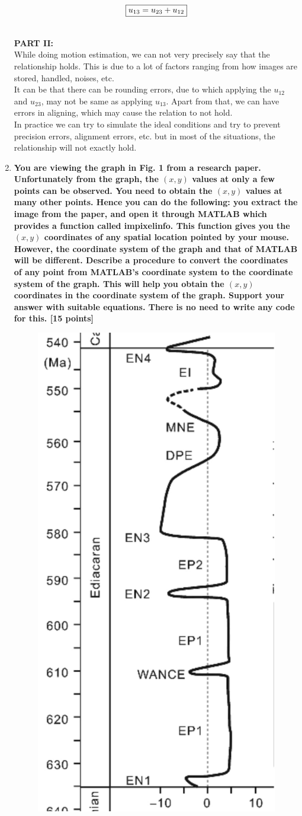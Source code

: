 \documentclass{article}
\begin{document}
\begin{enumerate}
\begin{equation}
    \fbox{$u_{13} = u_{23} + u_{12}$}
\end{equation}

\\\textbf{PART II:}\\
While doing motion estimation, we can not very precisely say that the relationship holds. This is due to a lot of factors ranging from how images are stored, handled, noises, etc. \\
It can be that there can be rounding errors, due to which applying the $u_{12}$ and $u_{23}$, may not be same as applying $u_{13}$. Apart from that, we can have errors in aligning, which may cause the relation to not hold.\\
In practice we can try to simulate the ideal conditions and try to prevent precision errors, alignment errors, etc. but in most of the situations, the relationship will not exactly hold.



\newpage
\item \textbf{You are viewing the graph in Fig. 1 from a research paper. Unfortunately from the graph, the $(x,y)$ values at only a few points can be observed. You need to obtain the $(x,y)$ values at many other points. Hence you can do the following: you extract the image from the paper, and open it through MATLAB which provides a function called impixelinfo. This function gives you the $(x,y)$ coordinates of any spatial location pointed by your mouse. However, the coordinate system of the graph and that of MATLAB will be different. Describe a procedure to convert the coordinates of any point from MATLAB's coordinate system to the coordinate system of the graph. This will help you obtain the $(x,y)$ coordinates in the coordinate system of the graph. Support your answer with suitable equations. There is no need to write any code for this. \textsf{[15 points]}}
\begin{figure}[!h]
    \centering
    \includegraphics[width=0.25\linewidth]{HomeWork_1/graph.jpeg}
\end{figure}
\\


\end{enumerate}
\end{document}
